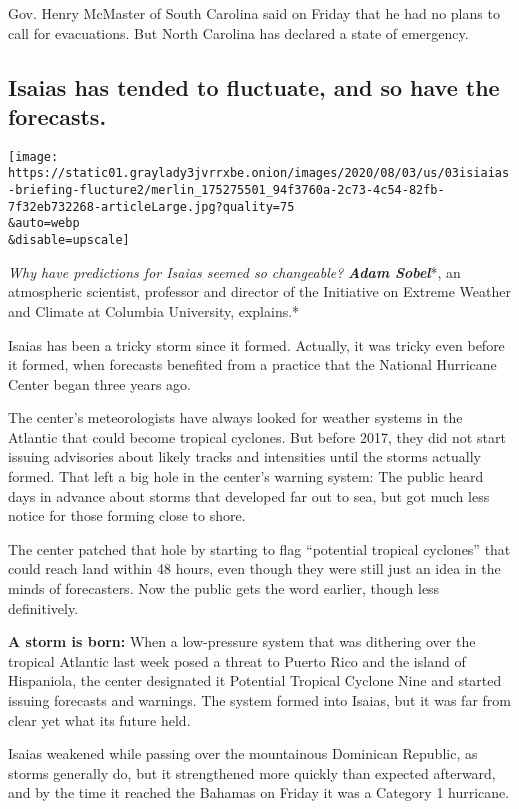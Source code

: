 Gov. Henry McMaster of South Carolina said on Friday that he had no
plans to call for evacuations. But North Carolina has declared a state
of emergency.

\hypertarget{isaias-has-tended-to-fluctuate-and-so-have-the-forecasts}{%
\subsection{Isaias has tended to fluctuate, and so have the
forecasts.}\label{isaias-has-tended-to-fluctuate-and-so-have-the-forecasts}}

\texttt{[image: https://static01.graylady3jvrrxbe.onion/images/2020/08/03/us/03isiaias-briefing-flucture2/merlin\_175275501\_94f3760a-2c73-4c54-82fb-7f32eb732268-articleLarge.jpg?quality=75\\\&auto=webp\\\&disable=upscale]}

\emph{Why have predictions for Isaias seemed so changeable?}
\emph{\textbf{Adam Sobel}}*, an atmospheric scientist, professor and
director of the Initiative on Extreme Weather and Climate at Columbia
University, explains.*

Isaias has been a tricky storm since it formed. Actually, it was tricky
even before it formed, when forecasts benefited from a practice that the
National Hurricane Center began three years ago.

The center's meteorologists have always looked for weather systems in
the Atlantic that could become tropical cyclones. But before 2017, they
did not start issuing advisories about likely tracks and intensities
until the storms actually formed. That left a big hole in the center's
warning system: The public heard days in advance about storms that
developed far out to sea, but got much less notice for those forming
close to shore.

The center patched that hole by starting to flag ``potential tropical
cyclones'' that could reach land within 48 hours, even though they were
still just an idea in the minds of forecasters. Now the public gets the
word earlier, though less definitively.

\textbf{A storm is born:} When a low-pressure system that was dithering
over the tropical Atlantic last week posed a threat to Puerto Rico and
the island of Hispaniola, the center designated it Potential Tropical
Cyclone Nine and started issuing forecasts and warnings. The system
formed into Isaias, but it was far from clear yet what its future held.

Isaias weakened while passing over the mountainous Dominican Republic,
as storms generally do, but it strengthened more quickly than expected
afterward, and by the time it reached the Bahamas on Friday it was a
Category 1 hurricane.

